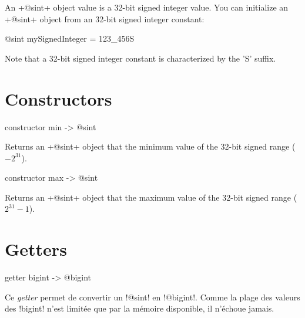 



An \ggst+@sint+ object value is a 32-bit signed integer value. You can initialize an \ggst+@sint+ object from an 32-bit signed integer constant:\\

\begin{galgas3}
@sint mySignedInteger = 123_456S
\end{galgas3}


Note that a 32-bit signed integer constant is characterized by the 'S' suffix.


\section{Constructors}


\begin{galgas3}
constructor min -> @sint
\end{galgas3}

Returns an \ggst+@sint+ object that the minimum value of the 32-bit signed range ($-2^{31}$).






\begin{galgas3}
constructor max -> @sint
\end{galgas3}


Returns an \ggst+@sint+ object that the maximum value of the 32-bit signed range ($2^{31}-1$).



\section{Getters}


\begin{galgas3box}
getter bigint -> @bigint
\end{galgas3box}

Ce \emph{getter} permet de convertir un \ggst!@sint! en \ggst!@bigint!. Comme la plage des valeurs des \ggst!bigint! n'est limitée que par la mémoire disponible, il n'échoue jamais.


